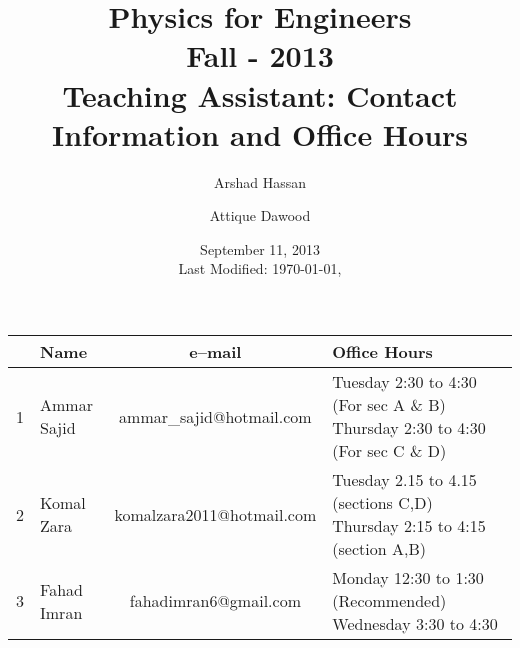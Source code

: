 \documentclass[12pt,a4paper]{article}
\title{\vspace{-3.5cm}Physics for Engineers\\Fall - 2013\\Teaching Assistant: Contact Information and Office Hours}
\author{Arshad Hassan\and Attique Dawood}
\date{September 11, 2013\\[0.2cm] Last Modified: \today, \currenttime}
\begin{document}
\maketitle
\begin{center}
\vspace{-0.5cm}
	\begin{longtable}{|c|l|c|p{7cm}|}
	\hline \hline
		\rule{0pt}{2.6ex} & \textbf{Name} & \textbf{e--mail} & \textbf{Office Hours}\\
		\hline
		1 \rule{0pt}{2.6ex} & Ammar Sajid & ammar\_sajid@hotmail.com & Tuesday 2:30 to 4:30 (For sec A \& B)
		Thursday 2:30 to 4:30 (For sec C \& D)\\
		\hline
		2 \rule{0pt}{2.6ex} & Komal Zara & komalzara2011@hotmail.com & Tuesday 2.15 to 4.15 (sections C,D)
		Thursday 2:15 to 4:15 (section A,B)\\
		\hline
		3 \rule{0pt}{2.6ex} & Fahad Imran & fahadimran6@gmail.com & Monday 12:30 to 1:30 (Recommended) Wednesday 3:30 to 4:30\\
	\hline \hline
	\end{longtable}
\end{center}
\end{document}
